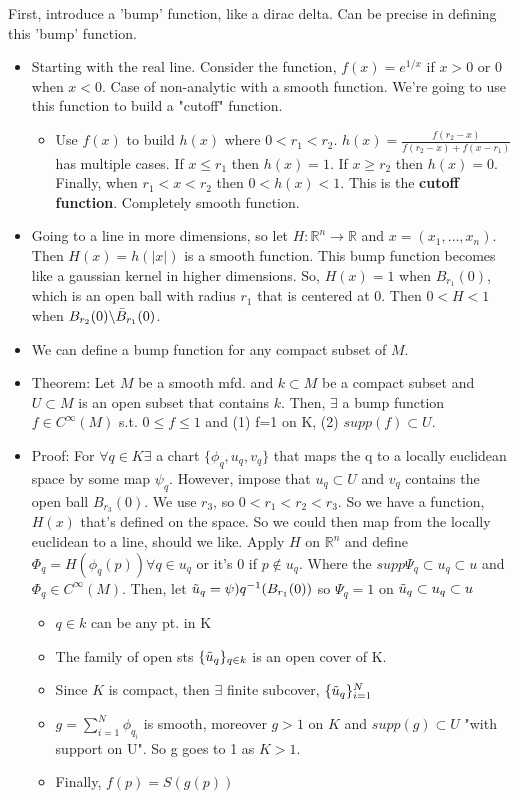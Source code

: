 \documentclass[12pt,letterpaper]{article}
\begin{document}
First, introduce a 'bump' function, like a dirac delta. Can be precise in defining this 'bump' function. 
\begin{itemize}
    \item Starting with the real line. Consider the function, $f(x) = e^{1/x}$ if $x > 0$ or 0 when $x < 0$. Case of non-analytic with a smooth function. We're going to use this function to build a "cutoff" function.
    \begin{itemize}
        \item Use $f(x)$ to build $h(x)$ where $0 < r_1 < r_2$. $h(x) = \frac{f(r_2 - x)}{f(r_2 - x) + f(x - r_1)}$ has multiple cases. If $x \leq r_1$ then $h(x)=1$. If $x \geq r_2$ then $h(x)=0$. Finally, when $r_1 < x <r_2$ then $0 < h(x) <1$. This is the \textbf{cutoff function}. Completely smooth function.
    \end{itemize}
    \item Going to a line in more dimensions, so let $H : \mathbb{R}^n \rightarrow\mathbb{R}$ and $x=(x_1, \dots, x_n)$. Then $H(x) = h(|x|)$ is a smooth function. This bump function becomes like a gaussian kernel in higher dimensions. So, $H(x)=1$ when $B_{r_1}(0)$, which is an open ball with radius $r_1$ that is centered at 0. Then $0 < H < 1$ when  $B_{r_2}(0)\backslash  \Bar{B}_{r_1}(0)$. 
    \item We can define a bump function for any compact subset of $M$. 
    \item Theorem: Let $M$ be a smooth mfd. and $k\subset M$ be a compact subset and $U \subset M$ is an open subset that contains $k$. Then, $\exists$ a bump function $f \in C^{\infty}(M)$ s.t. $0 \leq f \leq 1$ and (1) f=1 on K, (2) $supp(f)\subset U$.
    \item Proof: For $\forall q \in K \exists $ a chart $\{ \phi_q, u_q, v_q\}$ that maps the q to a locally euclidean space by some map $\psi_q$. However, impose that $u_q \subset U$ and $v_q$ contains the open ball $B_{r_3}(0)$. We use $r_3$, so $0<r_1 < r_2 <r_3$. So we have a function, $H(x)$ that's defined on the space. So we could then map from the locally euclidean to a line, should we like. Apply $H$ on $\mathbb{R}^n$ and define $\Phi_q= H(\phi_q(p)) \forall q \in u_q$ or it's 0 if $p \notin u_q$. Where the $supp\Psi_q \subset u_q \subset u$ and $\Phi_q \in C^{\infty}(M)$. Then, let $\Tilde{u}_q = \psi)q^{-1} 
    (B_{r_1}(0))$ so $\Psi_q = 1$ on $\Tilde{u}_q \subset u_q \subset u$
    \begin{itemize}
        \item $q \in k$ can be any pt. in K
        \item The family of open sts $\{ \Tilde{u}_q \}_{q\in k}$ is an open cover of K.
        \item Since $K$ is compact, then $\exists$ finite subcover, $\{\Tilde{u}_q \}^N_{i=1}$
        \item $g = \sum_{i=1}^N \phi_{q_i}$ is smooth, moreover $g>1$ on $K$ and $supp(g) \subset U$ "with support on U". So g goes to 1 as $K>1$. 
        \item Finally, $f(p) = S(g(p))$
    \end{itemize}
\end{itemize}
\end{document}
